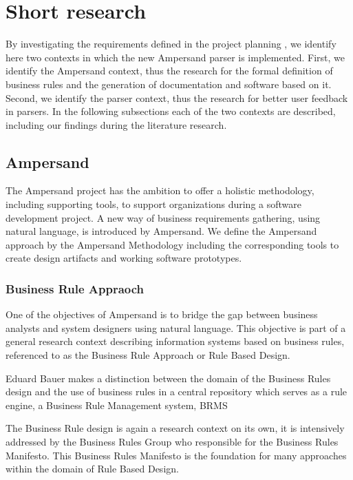 
\section{Short research}
\label{sec:research}
By investigating the requirements defined in the project planning , we identify here two contexts in which the new Ampersand parser is implemented.
First, we identify the Ampersand context, thus the research for the formal definition of business rules and the generation of documentation and software based  on it.
Second, we identify the parser context, thus the research for better user feedback in parsers.
In the following subsections each of the two contexts are described, including our findings during the literature research.

\subsection{Ampersand}
The Ampersand project has the ambition to offer a holistic methodology, including supporting tools, to support organizations during a software development project.
A new way of business requirements gathering, using natural language, is introduced by Ampersand.
We define the Ampersand approach by the Ampersand Methodology including the corresponding tools to create design artifacts and working software prototypes.

\subsubsection{Business Rule Appraoch}
One of  the objectives of Ampersand is to bridge the gap between business analysts and system designers using natural language.
This objective is part of a general research context describing information systems based on business rules, referenced to as the Business Rule Approach or Rule Based Design.

%
Eduard Bauer  makes a distinction between the domain of the Business Rules design and the use of business rules in a central repository which serves as a rule engine, a Business Rule Management system, BRMS

The Business Rule design is again a research context on its own, it is intensively addressed by the Business Rules Group who responsible for the Business Rules Manifesto.
This Business Rules Manifesto is the foundation for many approaches within the domain of Rule Based Design.

